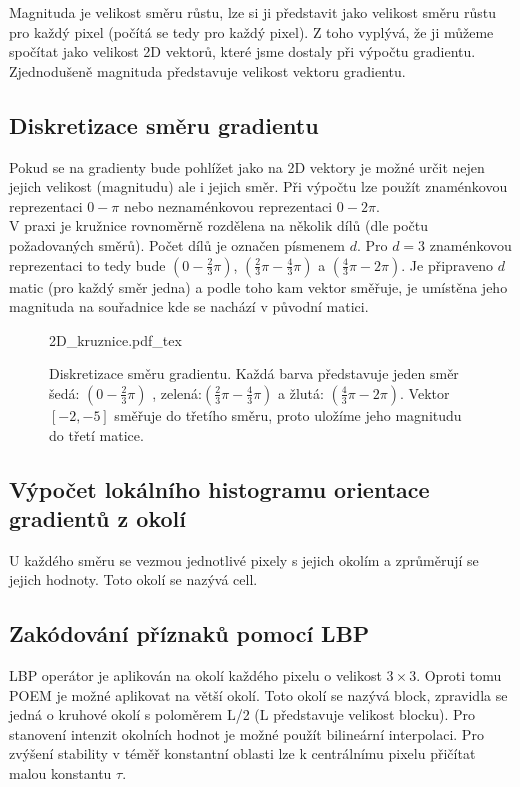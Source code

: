 \documentclass[czech,BP]{thesiskiv}
\begin{document}
Magnituda je velikost směru růstu, lze si ji představit jako velikost směru růstu pro každý pixel (počítá se tedy pro každý pixel).  Z toho vyplývá, že ji můžeme spočítat jako velikost 2D vektorů, které jsme dostaly při výpočtu gradientu. Zjednodušeně magnituda představuje velikost vektoru gradientu. \\

\subsection{Diskretizace směru gradientu}
Pokud se na gradienty bude pohlížet jako na 2D vektory je možné určit nejen jejich velikost (magnitudu) ale i jejich směr. Při výpočtu lze použít znaménkovou reprezentaci $0 - \pi$ nebo neznaménkovou reprezentaci $0 - 2\pi$. \\
V praxi je kružnice rovnoměrně rozdělena na několik dílů (dle počtu požadovaných směrů). Počet dílů  je označen písmenem $d$. Pro $d = 3$ znaménkovou reprezentaci to tedy bude $\left(0 - \frac{2}{3}\pi \right)$, $\left(\frac{2}{3}\pi - \frac{4}{3}\pi \right)$ a $\left(\frac{4}{3}\pi - 2\pi \right)$. Je připraveno $d$ matic (pro každý směr jedna) a podle toho kam vektor směřuje, je umístěna jeho magnituda na souřadnice kde se nachází v původní matici. 

\begin{figure}[H]
    \centering    
    \def\svgwidth{230pt}
	{2D_kruznice.pdf_tex}    
    \caption{Diskretizace směru gradientu. Každá barva představuje jeden směr šedá: $\left(0 - \frac{2}{3}\pi \right)$ , zelená:$\left(\frac{2}{3}\pi - \frac{4}{3}\pi \right)$ a žlutá: $\left(\frac{4}{3}\pi - 2\pi \right)$. Vektor $[ -2, -5 ]$ směřuje do třetího směru, proto uložíme jeho magnitudu do třetí matice. }
    \label{fig: 2D_graf}
\end{figure}

\subsection{Výpočet lokálního histogramu orientace gradientů z okolí}
U každého směru  se vezmou jednotlivé pixely s jejich okolím a zprůměrují se jejich hodnoty. Toto okolí se nazývá cell. \\

\subsection{Zakódování příznaků pomocí LBP}
\par LBP operátor je aplikován na okolí každého pixelu o velikost $3 \times 3$. Oproti tomu POEM je možné aplikovat na větší okolí. Toto okolí se nazývá block, zpravidla se jedná o kruhové okolí s poloměrem L/2 (L představuje velikost blocku). Pro stanovení intenzit okolních hodnot je možné použít bilineární interpolaci. Pro zvýšení stability v téměř konstantní oblasti lze k centrálnímu pixelu přičítat malou konstantu $\tau$. 
\end{document}
